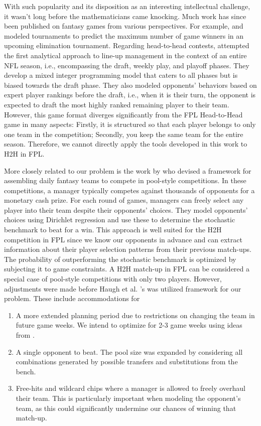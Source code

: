 \documentclass[12pt,oneside,a4paper]{book}
\theoremstyle{definition}
\theoremstyle{remark}
\begin{document}
			With such popularity and its disposition as an interesting intellectual challenge, it wasn’t long before the mathematicians came knocking. Much work has since been published on fantasy games from various perspectives. For example, \cite{Kaplan_Garstka_2001}  and \cite{Clair_Letscher_2007} modeled tournaments to predict the maximum number of game winners in an upcoming elimination tournament. Regarding head-to-head contests, \cite{becker2016analytical} attempted the first analytical approach to line-up management in the context of an entire NFL season, i.e., encompassing the draft, weekly play, and playoff phases. They develop a mixed integer programming model that caters to all phases but is biased towards the draft phase. They also modeled opponents' behaviors based on expert player rankings before the draft, i.e., when it is their turn, the opponent is expected to draft the most highly ranked remaining player to their team. However, this game format diverges significantly from the FPL Head-to-Head game in many aspects: Firstly, it is structured so that each player belongs to only one team in the competition; Secondly, you keep the same team for the entire season. Therefore, we cannot directly apply the tools developed in this work to H2H in FPL.

			More closely related to our problem is the work by \cite{haugh2021play} who devised a framework for assembling daily fantasy teams to compete in pool-style competitions. In these competitions, a manager typically competes against thousands of opponents for a monetary cash prize. For each round of games, managers can freely select any player into their team despite their opponents’ choices. They model opponents’ choices using Dirichlet regression and use these to determine the stochastic benchmark to beat for a win. This approach is well suited for the H2H competition in FPL since we know our opponents in advance and can extract information about their player selection patterns from their previous match-ups. The probability of outperforming the stochastic benchmark is optimized by subjecting it to game constraints. A H2H match-up in FPL can be considered a special case of pool-style competitions with only two players. However, adjustments were made before Haugh et al. \cite{haugh2021play}’s was utilized framework for our problem. These include accommodations for
			\begin{enumerate}
				\item[-] A more extended planning period due to restrictions on changing the team in future game weeks. We intend to optimize for 2-3 game weeks using ideas from  \cite{becker2016analytical}.
				\item[-] A single opponent to beat. The pool size was expanded by considering all combinations generated by possible transfers and substitutions from the bench.
				\item[-] Free-hits and wildcard chips where a manager is allowed to freely overhaul their team. This is particularly important when modeling the opponent’s team, as this could significantly undermine our chances of winning that match-up.
			\end{enumerate}
\end{document}
